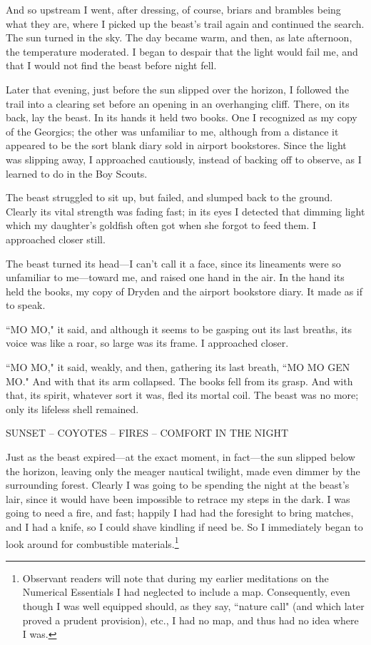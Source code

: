 \par
And so upstream I went, after dressing, of course, briars and brambles being what they are, where I picked up the beast's trail again and continued the search.  The sun turned in the sky.  The day became warm, and then, as late afternoon, the temperature moderated.  I began to despair that the light would fail me, and that I would not find the beast before night fell.
\par
Later that evening, just before the sun slipped over the horizon, I followed the trail into a clearing set before an opening in an overhanging cliff.  There, on its back, lay the beast.  In its hands it held two books.  One I recognized as my copy of the Georgics; the other was unfamiliar to me, although from a distance it appeared to be the sort blank diary sold in airport bookstores.  Since the light was slipping away, I approached cautiously, instead of backing off to observe, as I learned to do in the Boy Scouts.
\par
The beast struggled to sit up, but failed, and slumped back to the ground.  Clearly its vital strength was fading fast; in its eyes I detected that dimming light which my daughter's goldfish often got when she forgot to feed them.  I approached closer still.
\par
The beast turned its head—I can't call it a face, since its lineaments were so unfamiliar to me—toward me, and raised one hand in the air.  In the hand its held the books, my copy of Dryden and the airport bookstore diary.  It made as if to speak.
\par
``MO MO," it said, and although it seems to be gasping out its last breaths, its voice was like a roar, so large was its frame.  I approached closer.
\par
``MO MO," it said, weakly, and then, gathering its last breath, ``MO MO GEN MO."  And with that its arm collapsed.  The books fell from its grasp.  And with that, its spirit, whatever sort it was, fled its mortal coil.  The beast was no more; only its lifeless shell remained.
\par
\begin{center}
SUNSET – COYOTES – FIRES – COMFORT IN THE NIGHT
\end{center}
\par
Just as the beast expired—at the exact moment, in fact—the sun slipped below the horizon, leaving only the meager nautical twilight, made even dimmer by the surrounding forest.  Clearly I was going to be spending the night at the beast's lair, since it would have been impossible to retrace my steps in the dark.  I was going to need a fire, and fast; happily I had had the foresight to bring matches, and I had a knife, so I could shave kindling if need be.  So I immediately began to look around for combustible materials.\footnote{Observant readers will note that during my earlier meditations on the Numerical Essentials I had neglected to include a map.  Consequently, even though I was well equipped should, as they say, ``nature call" (and which later proved a prudent provision), etc., I had no map, and thus had no idea where I was.}
